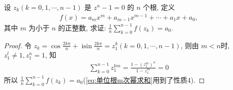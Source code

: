 \begin{example}
	设 $z_k(k=0,1, \cdots, n-1)$ 是 $z^n-1=0$ 的 $n$ 个根, 定义
	\begin{align*}
		f(x)=a_m x^m+a_{m-1} x^{m-1}+\cdots+a_1 x+a_0,
	\end{align*}
	其中 $m$ 为小于 $n$ 的正整数, 求证: $\frac{1}{n} \sum_{k=0}^{n-1} f\left(z_k\right)=a_0$.
\end{example}
\begin{proof}
	令 $z_k=\cos \frac{2 k \pi}{n}+\operatorname{isin} \frac{2 k \pi}{n}=z_1^k(k=0,1, \cdots, n-1)$, 则由 $m<n$时, $z_1^l \neq 1, z_1^n=1$, 知
	\begin{align}\label{eq:单位根m次幂求和}
		\sum_{k=0}^{n-1} z_1^{km}=\frac{1-\left(z_1^m\right)^n}{1-z_1^m}=0
	\end{align}
	所以 $\frac{1}{n} \sum_{k=0}^{n-1} f\left(z_k\right)=a_0$(\autoref{eq:单位根m次幂求和}用到了性质4).
\end{proof}

\begin{comment}
\begin{note}
	本题可以看作一个很重要的引理, 使用很方便, 可参考下例.
\end{note}


\begin{example}
	单位圆周上任意 $n$ 个点 $z_1, \cdots, z_n$. 求证：
	\begin{align}\label{eq:单位圆周上任意n个点}
		\max _{|z|=1}\left|z-z_1\right| \cdots\left|z-z_n\right| \geqslant 2,
	\end{align}
	并证明等号成立的充要条件是 $z_1, \cdots, z_n$ 构成正 $n$ 边形.
\end{example}
\begin{solution}
	因为通过适当的旋转, 可设 $z_1 z_2 \cdots z_n=(-1)^n$. 记
	\begin{align*}
		P(z)=\left(z-z_1\right) \cdots\left(z-z_n\right)=z^n+a_1 z^{n-1}+\cdots+a_{n-1} z+1=z^n+f(z)+1,
	\end{align*}

	其中 $f(z)$ 或为零, 或次数不超过 $n-1$. 设 $\zeta_1, \zeta_2, \cdots, \zeta_n$ 是全部 $n$ 次单位根,则由上例知
	\begin{align*}
		f\left(\zeta_1\right)+\cdots+f\left(\zeta_n\right)=0 .
	\end{align*}

	如果 $f(z)$ 不恒为 0 , 则存在 $j$ 使 $f\left(\zeta_j\right) \neq 0$, 且 $\operatorname{Re} f\left(\zeta_j\right) \geqslant 0$, 故 $\left|P\left(\zeta_j\right)\right|=$ $\left|2+f\left(\zeta_j\right)\right|>2$; 如 $f(z)$ 恒为 0 , 则当然有 $\left|P\left(\zeta_j\right)\right|=2$ .这就证明了\autoref{eq:单位圆周上任意n个点}.

	上面的论证还表明, 如果\autoref{eq:单位圆周上任意n个点}等号成立, 必须 $f\left(\zeta_j\right)=0(j=1,2, \cdots, n)$,这意味着 $f(z)=0$, 即 $P(z)=z^n+1$, 所以 $z_1, \cdots, z_n$ 构成正 $n$ 边形, 证毕.
\end{solution}
\end{comment}

